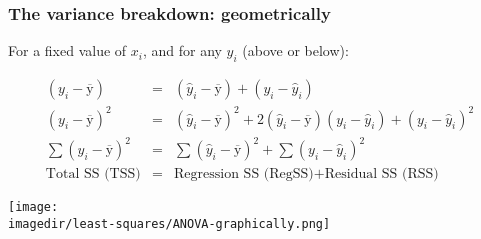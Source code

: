 \begin{frame}\frametitle{The variance breakdown: geometrically}

	For a fixed value of $x_i$, and for any $y_i$ (above or below):

	$$
	\begin{array}{rcl}
		(y_i - \overline{\mathrm{y}}) &=& (\hat{y}_i - \overline{\mathrm{y}}) + (y_i - \hat{y}_i) \\
		(y_i - \overline{\mathrm{y}})^2 &=& (\hat{y}_i - \overline{\mathrm{y}})^2 + 2(\hat{y}_i - \overline{\mathrm{y}})(y_i - \hat{y}_i) + (y_i - \hat{y}_i)^2 \\
		\sum{(y_i - \overline{\mathrm{y}})^2} &=& \sum{(\hat{y}_i - \overline{\mathrm{y}})^2} + \sum{(y_i - \hat{y}_i)^2} \\
		\text{Total SS (TSS)} &=& \text{Regression SS (RegSS)} + \text{Residual SS (RSS)}
	\end{array}
	$$
	\begin{center}
		\texttt{[image: \\imagedir/least-squares/ANOVA-graphically.png]}
	\end{center}
\end{frame}

